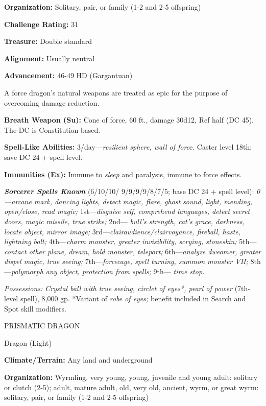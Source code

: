 \documentclass{article}
\begin{document}
\textbf{Organization:} Solitary, pair, or family (1-2 and 2-5 offspring) 

\textbf{Challenge Rating:} 31 

\textbf{Treasure:} Double standard 

\textbf{Alignment:} Usually neutral 

\textbf{Advancement:} 46-49 HD (Gargantuan) 

A force dragon's natural weapons are treated as epic for the purpose of overcoming 
damage reduction.

\textbf{Breath Weapon (Su):} Cone of force, 60 ft., damage 30d12, Ref half (DC 
45). The DC is Constitution-based.

\textbf{Spell-Like Abilities:} 3/day---\textit{resilient sphere, wall of forc}e. 
Caster level 18th; save DC 24 + spell level. 

\textbf{Immunities (Ex):} Immune to \textit{sleep }and paralysis, immune to force 
effects. 

\textit{\textbf{Sorcerer Spells Known}}\textit{ }(6/10/10/ 9/9/9/9/8/7/5; base 
DC 24 + spell level): \textit{0---arcane mark, dancing lights, detect magic, flare, 
ghost sound, light, mending, open/close, read magic; }1st---\textit{disguise self, 
comprehend languages, detect secret doors, magic missile, true strike; }2nd--- 
\textit{bull's strength, cat's grace, darkness, locate object, mirror image; }3rd---\textit{clairaudience/clairvoyance, 
fireball, haste, lightning bolt; }4th---\textit{charm monster, greater invisibility, 
scrying, stoneskin; }5th---\textit{contact other plane, dream, hold monster, teleport; 
}6th---\textit{analyze dweomer, greater dispel magic, true seeing; }7th---\textit{forcecage, 
spell turning, summon monster VII; }8th---\textit{polymorph any object, protection 
from spells; }9th--- \textit{time stop. }

\textit{Possessions: Crystal ball with true seeing, circlet of eyes*, pearl of 
power }(7th-level spell), 8,000 gp. *Variant of \textit{robe of eyes; }benefit 
included in Search and Spot skill modifiers. 

\vspace{12pt}
PRISMATIC DRAGON 

Dragon (Light) 

\textbf{Climate/Terrain:} Any land and underground 

\textbf{Organization:} Wyrmling, very young, young, juvenile and young adult: solitary 
or clutch (2-5); adult, mature adult, old, very old, ancient, wyrm, or great wyrm: 
solitary, pair, or family (1-2 and 2-5 offspring) 
\end{document}
